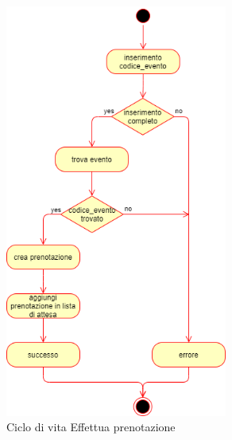 \documentclass[11pt]{article}
\begin{document}
\begin{figure}[H]
\centering
\includegraphics[width=0.65\textwidth]{Ciclo di vita Effettua prenotazione.png}
\caption{Ciclo di vita Effettua prenotazione}
\end{figure}
\end{document}
